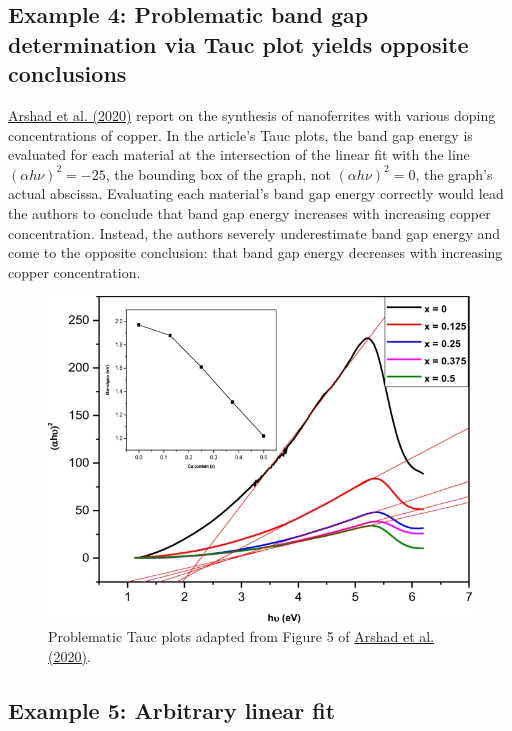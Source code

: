 \documentclass[letterpaper, 12pt]{article}
\begin{document}
\pagebreak

\subsection*{Example 4: Problematic band gap determination via Tauc plot yields opposite conclusions}

\href{https://doi.org/10.1007/s10948-020-05735-4}{Arshad et al. (2020)} report on the synthesis of nanoferrites with various doping concentrations of copper. In the article's Tauc plots, the band gap energy is evaluated for each material at the intersection of the linear fit with the line $(\alpha h \nu)^{2} = -25$, the bounding box of the graph, not $(\alpha h \nu)^{2} = 0$, the graph's actual abscissa. Evaluating each material's band gap energy correctly would lead the authors to conclude that band gap energy increases with increasing copper concentration. Instead, the authors severely underestimate band gap energy and come to the opposite conclusion: that band gap energy decreases with increasing copper concentration.

\begin{figure}[h!tbp]
    \centering
    \includegraphics[width=\textwidth]{img/tauc/image-1733426799694.png}
    \caption*{Problematic Tauc plots adapted from Figure 5 of \href{https://doi.org/10.1007/s10948-020-05735-4}{Arshad et al. (2020)}.}
\end{figure}

\pagebreak
\subsection*{Example 5: Arbitrary linear fit}
\end{document}
